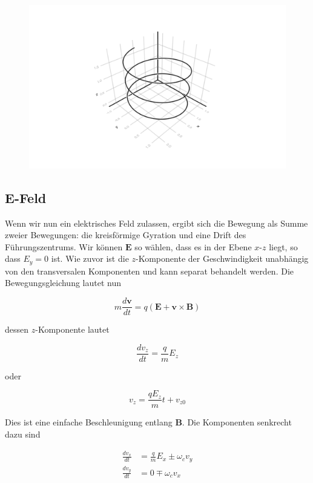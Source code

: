\documentclass[
  a4paper,
  DIV=11]{scrreprt}
\begin{document}
\begin{figure}[H]

{\centering \includegraphics{./Tutorial_files/figure-pdf/cell-4-output-1.png}

}

\end{figure}

\hypertarget{e-feld}{%
\subsection{E-Feld}\label{e-feld}}

Wenn wir nun ein elektrisches Feld zulassen, ergibt sich die Bewegung
als Summe zweier Bewegungen: die kreisförmige Gyration und eine Drift
des Führungszentrums. Wir können \(\mathbf{E}\) so wählen, dass es in
der Ebene \(x\)-\(z\) liegt, so dass \(E_y = 0\) ist. Wie zuvor ist die
\(z\)-Komponente der Geschwindigkeit unabhängig von den transversalen
Komponenten und kann separat behandelt werden. Die Bewegungsgleichung
lautet nun

\[
m\frac{d\mathbf{v}}{dt} = q( \mathbf{E} + \mathbf{v}\times\mathbf{B} )
\]

dessen \(z\)-Komponente lautet

\[
\frac{dv_z}{dt} = \frac{q}{m}E_z
\]

oder

\[
v_z = \frac{qE_z}{m}t + v_{z0}
\]

Dies ist eine einfache Beschleunigung entlang \(\mathbf{B}\). Die
Komponenten senkrecht dazu sind

\[
\begin{aligned}
\frac{dv_x}{dt} &= \frac{q}{m}E_x \pm \omega_c v_y \\
\frac{dv_y}{dt} &= 0 \mp \omega_c v_x
\end{aligned}
\]
\end{document}
